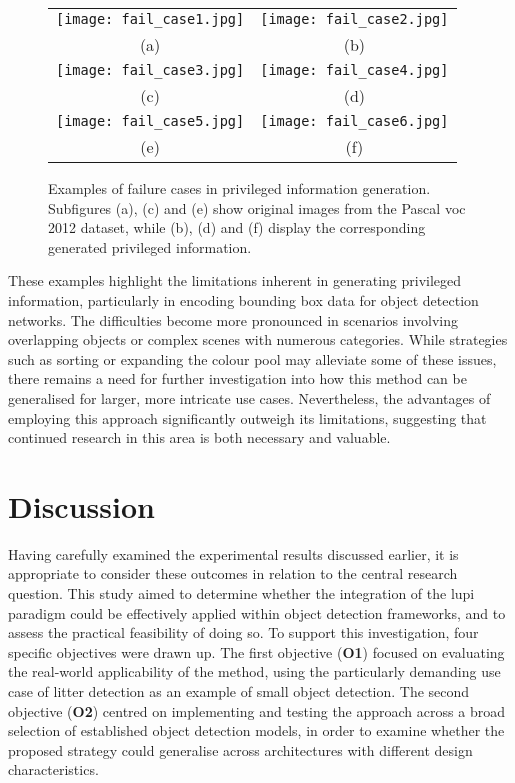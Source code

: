 \begin{figure}[!ht]
  \centering
  \begin{tabular}{cc}
    \texttt{[image: fail\_case1.jpg]} &
    \texttt{[image: fail\_case2.jpg]} \\
    \small (a) & \small (b) \\
    \addlinespace[1em]
    \texttt{[image: fail\_case3.jpg]} &
    \texttt{[image: fail\_case4.jpg]} \\
    \small (c) & \small (d) \\
    \addlinespace[1em]
    \texttt{[image: fail\_case5.jpg]} &
    \texttt{[image: fail\_case6.jpg]} \\
    \small (e) & \small (f) \\
  \end{tabular}
  \caption{Examples of failure cases in privileged information generation. Subfigures (a), (c) and (e) show original images from the Pascal \gls{voc} 2012 dataset, while (b), (d) and (f) display the corresponding generated privileged information.}
  \label{fig:fail_cases}
\end{figure}

These examples highlight the limitations inherent in generating privileged information, particularly in encoding bounding box data for object detection networks. The difficulties become more pronounced in scenarios involving overlapping objects or complex scenes with numerous categories. While strategies such as sorting or expanding the colour pool may alleviate some of these issues, there remains a need for further investigation into how this method can be generalised for larger, more intricate use cases. Nevertheless, the advantages of employing this approach significantly outweigh its limitations, suggesting that continued research in this area is both necessary and valuable.

\section{Discussion}
\label{sec:5_discussion}

Having carefully examined the experimental results discussed earlier, it is appropriate to consider these outcomes in relation to the central research question. This study aimed to determine whether the integration of the \gls{lupi} paradigm could be effectively applied within object detection frameworks, and to assess the practical feasibility of doing so. To support this investigation, four specific objectives were drawn up. The first objective (\textbf{O1}) focused on evaluating the real-world applicability of the method, using the particularly demanding use case of litter detection as an example of small object detection. The second objective (\textbf{O2}) centred on implementing and testing the approach across a broad selection of established object detection models, in order to examine whether the proposed strategy could generalise across architectures with different design characteristics.

